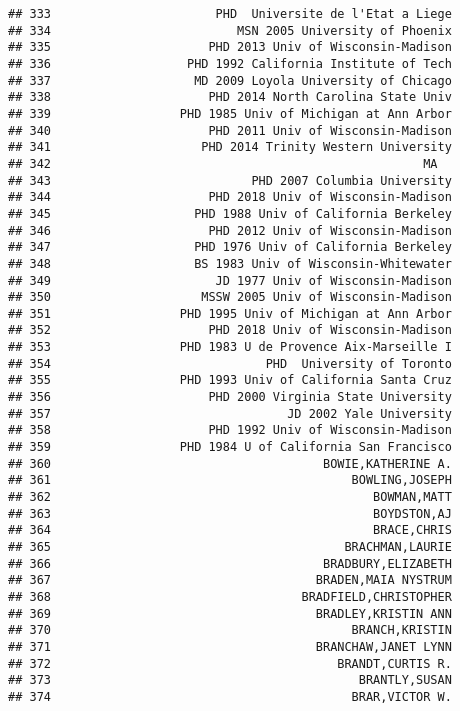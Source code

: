 \documentclass[
]{article}
\begin{document}
\begin{verbatim}
## 333                       PHD  Universite de l'Etat a Liege
## 334                          MSN 2005 University of Phoenix
## 335                      PHD 2013 Univ of Wisconsin-Madison
## 336                   PHD 1992 California Institute of Tech
## 337                    MD 2009 Loyola University of Chicago
## 338                      PHD 2014 North Carolina State Univ
## 339                  PHD 1985 Univ of Michigan at Ann Arbor
## 340                      PHD 2011 Univ of Wisconsin-Madison
## 341                     PHD 2014 Trinity Western University
## 342                                                    MA  
## 343                            PHD 2007 Columbia University
## 344                      PHD 2018 Univ of Wisconsin-Madison
## 345                    PHD 1988 Univ of California Berkeley
## 346                      PHD 2012 Univ of Wisconsin-Madison
## 347                    PHD 1976 Univ of California Berkeley
## 348                    BS 1983 Univ of Wisconsin-Whitewater
## 349                       JD 1977 Univ of Wisconsin-Madison
## 350                     MSSW 2005 Univ of Wisconsin-Madison
## 351                  PHD 1995 Univ of Michigan at Ann Arbor
## 352                      PHD 2018 Univ of Wisconsin-Madison
## 353                  PHD 1983 U de Provence Aix-Marseille I
## 354                              PHD  University of Toronto
## 355                  PHD 1993 Univ of California Santa Cruz
## 356                      PHD 2000 Virginia State University
## 357                                 JD 2002 Yale University
## 358                      PHD 1992 Univ of Wisconsin-Madison
## 359                  PHD 1984 U of California San Francisco
## 360                                      BOWIE,KATHERINE A.
## 361                                          BOWLING,JOSEPH
## 362                                             BOWMAN,MATT
## 363                                             BOYDSTON,AJ
## 364                                             BRACE,CHRIS
## 365                                         BRACHMAN,LAURIE
## 366                                      BRADBURY,ELIZABETH
## 367                                     BRADEN,MAIA NYSTRUM
## 368                                   BRADFIELD,CHRISTOPHER
## 369                                     BRADLEY,KRISTIN ANN
## 370                                          BRANCH,KRISTIN
## 371                                     BRANCHAW,JANET LYNN
## 372                                        BRANDT,CURTIS R.
## 373                                           BRANTLY,SUSAN
## 374                                          BRAR,VICTOR W.

\end{verbatim}
\end{document}

